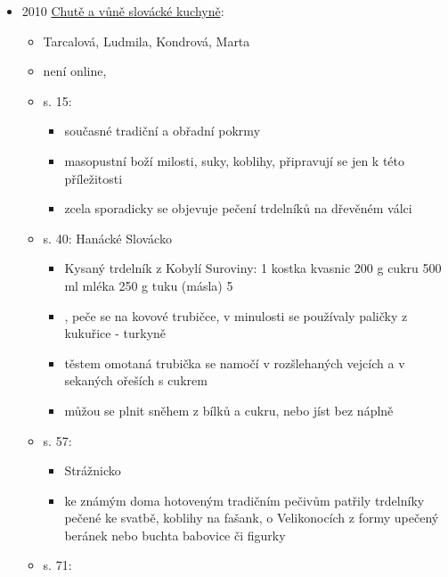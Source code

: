 \begin{itemize}
\begin{itemize}
    \begin{itemize}
    \tightlist
    \item
      obrázek pečení na loukotích, mají taky kličky a jsou postavený na
      cihlách
    \end{itemize}
  \end{itemize}
\item
  2010
  \href{https://ceskadigitalniknihovna.cz/uuid/uuid:1b8fd480-8ee4-11ea-ae16-005056827e52}{Chutě
  a vůně slovácké kuchyně}:

  \begin{itemize}
  \tightlist
  \item
    Tarcalová, Ludmila, Kondrová, Marta
  \item
    není online,
  \item
    s. 15:

    \begin{itemize}
    \tightlist
    \item
      současné tradiční a obřadní pokrmy
    \item
      masopustní boží milosti, suky, koblihy, připravují se jen k této
      příležitosti
    \item
      zcela sporadicky se objevuje pečení trdelníků na dřevěném válci
    \end{itemize}
  \item
    s. 40: Hanácké Slovácko

    \begin{itemize}
    \tightlist
    \item
      Kysaný trdelník z Kobylí Suroviny: 1 kostka kvasnic 200 g cukru
      500 ml mléka 250 g tuku (másla) 5
    \item
       , peče se na kovové trubičce, v minulosti se
      používaly paličky z kukuřice - turkyně
    \item
      těstem omotaná trubička se namočí v rozšlehaných vejcích a v
      sekaných ořeších s cukrem
    \item
      můžou se plnit sněhem z bílků a cukru, nebo jíst bez náplně
    \end{itemize}
  \item
    s. 57:

    \begin{itemize}
    \tightlist
    \item
      Strážnicko
    \item
      ke známým doma hotoveným tradičním pečivům patřily trdelníky
      pečené ke svatbě, koblihy na fašank, o Velikonocích z formy
      upečený beránek nebo buchta babovice či figurky
    \end{itemize}
  \item
    s. 71:


\end{itemize}
\end{itemize}
